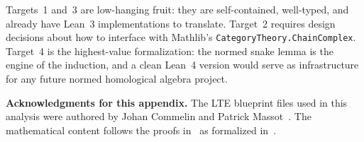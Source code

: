 Targets~1 and~3 are low-hanging fruit: they are self-contained,
well-typed, and already have Lean~3 implementations to translate.
Target~2 requires design decisions about how to interface
with Mathlib's \texttt{CategoryTheory.ChainComplex}.
Target~4 is the highest-value formalization: the normed snake
lemma is the engine of the induction, and a clean Lean~4
version would serve as infrastructure for any future normed
homological algebra project.

\medskip
\noindent\textbf{Acknowledgments for this appendix.}
The LTE blueprint files used in this analysis were authored by Johan Commelin
and Patrick Massot~\cite{commelin-massot-lte}. The mathematical content follows
the proofs in~\cite{scholze-condensed} as formalized in~\cite{commelin-massot-lte}.
